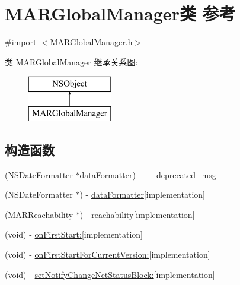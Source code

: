 \hypertarget{interface_m_a_r_global_manager}{}\section{M\+A\+R\+Global\+Manager类 参考}
\label{interface_m_a_r_global_manager}


{\ttfamily \#import $<$M\+A\+R\+Global\+Manager.\+h$>$}

类 M\+A\+R\+Global\+Manager 继承关系图\+:\begin{figure}[H]
\begin{center}
\leavevmode
\includegraphics[height=2.000000cm]{interface_m_a_r_global_manager}
\end{center}
\end{figure}
\subsection*{构造函数}
\begin{DoxyCompactItemize}
\item 
(N\+S\+Date\+Formatter $\ast$\hyperlink{interface_m_a_r_global_manager_a1c44749ed33c07086829c958d8bc1c6d}{data\+Formatter}) -\/ \hyperlink{interface_m_a_r_global_manager_a1eeccccea3a359e7669dd51a8542786d}{\+\_\+\+\_\+deprecated\+\_\+msg}
\item 
(N\+S\+Date\+Formatter $\ast$) -\/ \hyperlink{interface_m_a_r_global_manager_a1c44749ed33c07086829c958d8bc1c6d}{data\+Formatter}{\ttfamily  \mbox{[}implementation\mbox{]}}
\item 
(\hyperlink{interface_m_a_r_reachability}{M\+A\+R\+Reachability} $\ast$) -\/ \hyperlink{interface_m_a_r_global_manager_a8331f91b2a9bbb137c5bd786f1748bf1}{reachability}{\ttfamily  \mbox{[}implementation\mbox{]}}
\item 
(void) -\/ \hyperlink{interface_m_a_r_global_manager_aa4630974c2d25f5329ee018b5a082d83}{on\+First\+Start\+:}{\ttfamily  \mbox{[}implementation\mbox{]}}
\item 
(void) -\/ \hyperlink{interface_m_a_r_global_manager_a9fbd733535e678723c05fe81aa99891a}{on\+First\+Start\+For\+Current\+Version\+:}{\ttfamily  \mbox{[}implementation\mbox{]}}
\item 
(void) -\/ \hyperlink{interface_m_a_r_global_manager_ae290992d401c39b69942477f85b883e3}{set\+Notify\+Change\+Net\+Status\+Block\+:}{\ttfamily  \mbox{[}implementation\mbox{]}}
\end{DoxyCompactItemize}
